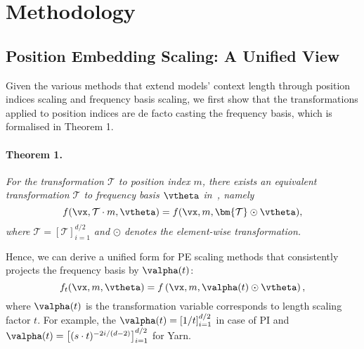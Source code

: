 \section{Methodology}
\label{sec:method}
\subsection{Position Embedding Scaling: A Unified View}
Given the various methods that extend models' context length through position indices scaling  and frequency basis scaling, we first show that the transformations applied to position indices are de facto casting the frequency basis, which is formalised in Theorem 1.

\paragraph{Theorem 1.} \textit{For the transformation $\mathcal{T}$ to position index $m$, there exists an equivalent transformation $\bm{\mathcal{T}}$ to frequency basis $\vtheta$ in~, namely}
\begin{equation}
\label{eq:eq_of_pi_fb}
    f(\vx, \mathcal{T} \cdot m, \vtheta) = f(\vx, m, \bm{\mathcal{T}} \odot \vtheta),
\end{equation}
\textit{where $\bm{\mathcal{T}}=\left[\mathcal{T}\right]_{i=1}^{d/2} $ and $\odot$ denotes the element-wise transformation.}

Hence, we can derive a unified form for PE scaling methods that consistently projects the frequency basis by $\valpha(t)$:
\begin{equation}
    f_t(\vx, m, \vtheta) = f\left(\vx, m,  \valpha(t) \odot \vtheta \right),
\end{equation}
where $\valpha(t)$ is the transformation variable corresponds to length scaling factor $t$. For example, the $\valpha(t)=\left[1/t\right]_{i=1}^{d/2}$ in case of PI and $\valpha(t)=\left[(s \cdot t)^{-2i/(d-2)}\right]_{i=1}^{d/2}$ for Yarn.






